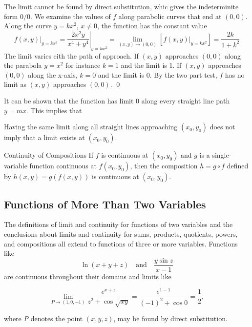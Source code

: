 \documentclass[12pt,a4paper,draft]{article}
\newenvironment{ruleBox}[1]{\begin{rulebox}{#1}}{\end{rulebox}\vspace{1\baselineskip}}
\newenvironment{mynote}{\vspace{1\baselineskip}\begin{note}}{\end{note}\vspace{1\baselineskip}}
\begin{document}
\begin{solution}
    The limit cannot be found by direct substitution, whic gives the indeterminite form \(0 \slash 0\).
    We examine the values of \(f\) along parabolic curves that end at \((0,0)\). Along the curve \(y = kx^2\), \(x \neq 0\), the function has the constant value
    \[\left. f(x,y) \right|_{y = kx^2} = \left. \frac{2x^2y}{x^4+y^4} \right|_{y=kx^2} = \lim_{(x,y) \to (0,0)}\left[\left.f(x,y)\right|_{y=kx^2}\right] = \frac{2k}{1+k^2}\]
The limit varies eith the path of approach. If \((x,y)\) approaches \((0,0)\) along the parabola \(y=x^2\) for instance \(k=1\) and the limit is 1. If \((x,y)\) approaches \((0,0)\) along the x-axis, \(k=0\) and the limit is 0. By the two part test, \(f\) has no limit as \((x,y)\) approaches \((0,0)\). \hfill \qed

It can be shown that the function has limit 0 along every straight line path \(y = mx\). This implies that 

\begin{mynote}
Having the same limit along all straight lines approaching \((x_0,y_0)\) does not imply that a limit exists at \((x_0,y_0)\).
\end{mynote}

\end{solution}

\begin{ruleBox}{Continuity of Compositions}
    If \(f\) is continuous at \((x_0,y_0)\) and \(g\) is a single-variable function continuous at \(f(x_0,y_0)\), then the composition \(h = g \circ f\) defined  by \(h(x,y) = g(f(x,y))\) is continuous at \((x_0,y_0)\).

\end{ruleBox}

\subsection{Functions of More Than Two Variables}
The definitions of limit and continuity for functions of two variables and the conclusions about limits and continuity for sums, products, quotients, powers, and compositions all extend to functions of three or more variables. Functions like
\[\ln(x+ y +z) \quad \text{and} \quad \frac{y \sin{z}}{x-1}\]
are continuous throughout their domains and limits like

\[\lim _{P \rightarrow(1,0,-1)} \frac{e^{x+z}}{z^2+\cos \sqrt{x y}}=\frac{e^{1-1}}{(-1)^2+\cos 0}=\frac{1}{2},\]

where \textit{P} denotes the point \((x,y,z)\), may be found by direct substitution.
\end{document}
